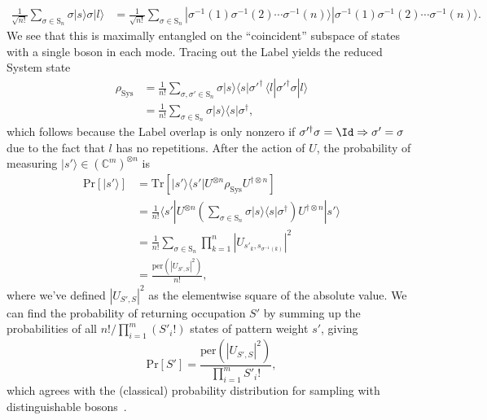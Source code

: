 \begin{align}\label{eq:ComDis}
\frac{1}{\sqrt{n!}} \sum_{\sigma \in \textrm{S}_n}\sigma|s\rangle\sigma|l\rangle
&=\frac{1}{\sqrt{n!}} \sum_{\sigma \in \textrm{S}_n}|\sigma^{-1}(1) \sigma^{-1}(2) \cdots \sigma^{-1}(n)\rangle |\sigma^{-1}(1) \sigma^{-1}(2) \cdots \sigma^{-1}(n)\rangle .
\end{align}
We see that this is maximally entangled on the ``coincident'' subspace of states with a single boson in each mode.
Tracing out the Label yields the reduced System state
\begin{align}
\rho_\mathrm{Sys}
 &= \frac{1}{n!} \sum_{\sigma, \sigma' \in \textrm{S}_n} \sigma|s\rangle\langle s|\sigma'^\dagger \, \langle l|\sigma'^\dagger \sigma|l\rangle \\
 &= \frac{1}{n!} \sum_{\sigma \in \textrm{S}_n} \sigma|s\rangle\langle s|\sigma^\dagger ,
\end{align}
which follows because the Label overlap is only nonzero if $\sigma'^\dag \sigma = \Id \Rightarrow \sigma'=\sigma$ due to the fact that $l$ has no repetitions.
After the action of $U$, the probability of measuring $|s'\rangle \in (\mathbb{C}^m)^{\otimes n}$ is
\begin{align}
\textrm{Pr}[|s'\rangle]
 &= \textrm{Tr}[|s'\rangle\langle s'|U^{\otimes n}\rho_\mathrm{Sys} U^{\dagger\otimes n}]\\
 &= \frac{1}{n!} \langle s'|U^{\otimes n}\left(\sum_{\sigma \in  \textrm{S}_n}\sigma|s\rangle\langle s|\sigma^\dagger\right)U^{\dagger\otimes n}|s'\rangle\\
 &= \frac{1}{n!} \sum_{\sigma \in  \textrm{S}_n} \prod_{k=1}^n |U_{s'_k,s_{\sigma^{-1}(k)}}|^2\\
 &= \frac{\textrm{per}(|U_{S',S}|^2)}{n!} ,
\end{align}
where we've defined $|U_{S',S}|^2$ as the elementwise square of the absolute value.
We can find the probability of returning occupation $S'$ by summing up the probabilities of all $n!/\prod_{i=1}^{m}(S'_i!)$ states of pattern weight $s'$, giving
\begin{equation}\label{eq:DistPer}
\textrm{Pr}[S'] = \frac{\textrm{per}(|U_{S',S}|^2)}{\prod_{i=1}^m S'_i!},
\end{equation}
which agrees with the (classical) probability distribution for sampling with distinguishable bosons~\cite{aaronson2014}.

